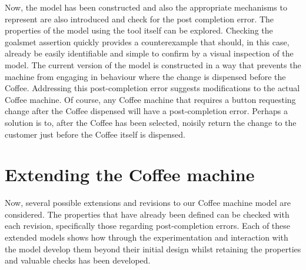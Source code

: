 \documentclass[a4paper,12pt]{extarticle}
\begin{document}
Now, the model has been constructed and also the appropriate mechanisms to represent are also introduced and check for the post completion error. The properties of the model using the tool itself can be explored. Checking the goalsmet assertion quickly provides a counterexample that should, in this case, already be easily identifiable and simple to confirm by a visual inspection of the model. The current version of the model is constructed in a way that prevents the machine from engaging in behaviour where the change is dispensed before the Coffee. Addressing this post-completion error suggests modifications to the actual Coffee machine. Of course, any Coffee machine that requires a button requesting change after the Coffee dispensed will have a post-completion error. Perhaps a solution is to, after the Coffee has been selected, noisily return the change to the customer just before the Coffee itself is dispensed.
\section{Extending the Coffee machine}
\label{Cofee machine ext}
Now, several possible extensions and revisions to our Coffee machine model are considered. The properties that have already been defined can be checked with each revision, specifically those regarding post-completion errors. Each of these extended models shows how through the experimentation and interaction with the model develop them beyond their initial design whilst retaining the properties and valuable checks has been developed.
\end{document}
